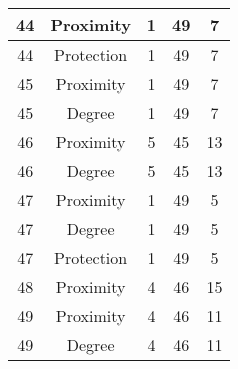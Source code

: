 \documentclass[results.tex]{subfiles}
\begin{document}
\begin{center}
\begin{tabular}{| c || c | c | c | c |}
            \hline
            44                      & Proximity                    & 1                      & 49                      & 7                    \\
            \hline
            44                      & Protection                   & 1                      & 49                      & 7                    \\
            \hline
            45                      & Proximity                    & 1                      & 49                      & 7                    \\
            \hline
            45                      & Degree                       & 1                      & 49                      & 7                    \\
            \hline
            46                      & Proximity                    & 5                      & 45                      & 13                   \\
            \hline
            46                      & Degree                       & 5                      & 45                      & 13                   \\
            \hline
            47                      & Proximity                    & 1                      & 49                      & 5                    \\
            \hline
            47                      & Degree                       & 1                      & 49                      & 5                    \\
            \hline
            47                      & Protection                   & 1                      & 49                      & 5                    \\
            \hline
            48                      & Proximity                    & 4                      & 46                      & 15                   \\
            \hline
            49                      & Proximity                    & 4                      & 46                      & 11                   \\
            \hline
            49                      & Degree                       & 4                      & 46                      & 11                   \\
            \hline
        \end{tabular}
    \end{center}
\end{document}
